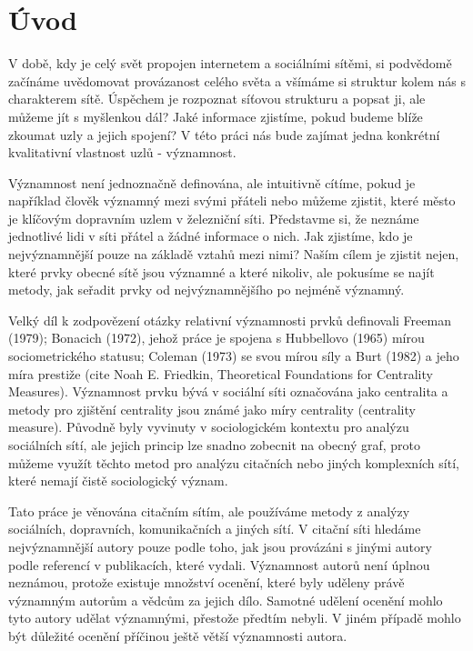 \documentclass{bakalarka}
\begin{document}
\tableofcontents
\pagestyle{fancy}

\chapter{Úvod}
V době, kdy je celý svět propojen internetem a sociálními sítěmi, si podvědomě
začínáme uvědomovat provázanost celého světa a všímáme si struktur kolem nás s
charakterem sítě. Úspěchem je rozpoznat síťovou strukturu a popsat ji, ale
můžeme jít s myšlenkou dál? Jaké informace zjistíme, pokud budeme blíže zkoumat
uzly a jejich spojení? V této práci nás bude zajímat jedna konkrétní
kvalitativní vlastnost uzlů - významnost.

Významnost není jednoznačně definována, ale intuitivně cítíme, pokud je
například člověk významný mezi svými přáteli nebo můžeme zjistit, které město
je klíčovým dopravním uzlem v železniční síti.  Představme si, že neznáme
jednotlivé lidi v síti přátel a žádné informace o nich. Jak zjistíme, kdo je
nejvýznamnější pouze na základě vztahů mezi nimi? Naším cílem je zjistit nejen,
které prvky obecné sítě jsou významné a které nikoliv, ale pokusíme se najít
metody, jak seřadit prvky od nejvýznamnějšího po nejméně významný.

Velký díl k zodpovězení otázky relativní významnosti prvků definovali Freeman
(1979); Bonacich (1972), jehož práce je spojena s Hubbellovo (1965) mírou
sociometrického statusu; Coleman (1973) se svou mírou síly a Burt (1982) a jeho
míra prestiže (cite Noah E. Friedkin, Theoretical Foundations for Centrality
Measures). Významnost prvku bývá v sociální síti označována jako centralita a
metody pro zjištění centrality jsou známé jako míry centrality (centrality
measure). Původně byly vyvinuty v sociologickém kontextu pro analýzu sociálních
sítí, ale jejich princip lze snadno zobecnit na obecný graf, proto můžeme
využít těchto metod pro analýzu citačních nebo jiných komplexních sítí, které
nemají čistě sociologický význam.

Tato práce je věnována citačním sítím, ale používáme metody z analýzy
sociálních, dopravních, komunikačních a jiných sítí. V citační síti hledáme
nejvýznamnější autory pouze podle toho, jak jsou provázáni s jinými autory
podle referencí v publikacích, které vydali. Významnost autorů není úplnou
neznámou, protože existuje množství ocenění, které byly uděleny právě významným
autorům a vědcům za jejich dílo. Samotné udělení ocenění mohlo tyto autory
udělat významnými, přestože předtím nebyli. V jiném případě mohlo být důležité
ocenění příčinou ještě větší významnosti autora. 
\end{document}
